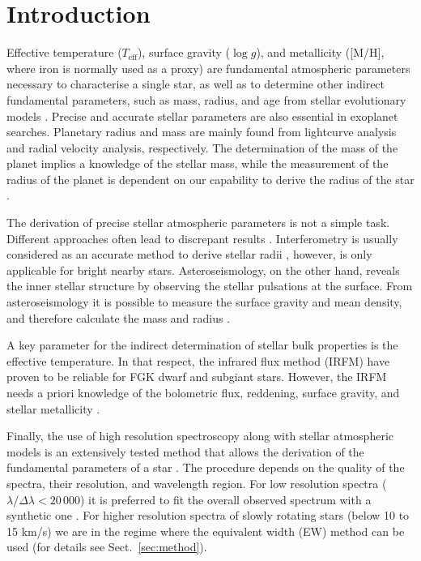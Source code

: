 \documentclass{aa}
\begin{document}
\maketitle



\section{Introduction}
\label{sec:introduction}

Effective temperature ($T_\mathrm{eff}$), surface gravity ($\log g$),
and metallicity ([M/H], where iron is normally used as a proxy)
are fundamental atmospheric parameters necessary to characterise a single
star, as well as to determine other indirect fundamental parameters,
such as mass, radius, and age from stellar evolutionary models
\citep[see e.g.][]{Girardi2000,Dotter2008,Baraffe2015}.
Precise and accurate stellar parameters are also essential in
exoplanet searches. Planetary radius and mass are mainly found from
lightcurve analysis and radial velocity analysis, respectively. The
determination of the mass of the planet implies a knowledge of the
stellar mass, while the measurement of the radius of the planet
is dependent on our capability to derive the radius of the star
\citep[see e.g.][]{Torres2008,Ammler2009,Torres2012}.

The derivation of precise stellar atmospheric parameters is not a simple
task. Different approaches often lead to discrepant results \citep[see
e.g.][]{Santos13}. Interferometry is usually considered as an accurate
method to derive stellar radii \citep[e.g.][]{Boyajian2012}, however,
is only applicable for bright nearby stars. Asteroseismology, on the
other hand, reveals the inner stellar structure by observing the stellar
pulsations at the surface. From asteroseismology it is possible to
measure the surface gravity and mean density, and therefore calculate
the mass and radius \citep[e.g.][]{Kjeldsen1995}.

A key parameter for the indirect determination of stellar bulk
properties is the effective temperature. In that respect, the infrared
flux method (IRFM) have proven to be reliable for FGK dwarf and
subgiant stars. However, the IRFM needs a priori knowledge of the
bolometric flux, reddening, surface gravity, and stellar metallicity
\citep{Blackwell1977,Ramirez2005b,Casagrande2010}.

Finally, the use of high resolution spectroscopy along with stellar
atmospheric models is an extensively tested method that allows
the derivation of the fundamental parameters of a star \citep[see
e.g.][]{Santos13,Valenti2005}. The procedure depends on the quality
of the spectra, their resolution, and wavelength region. For low
resolution spectra ($\lambda/\Delta\lambda < 20\,000$) it is
preferred to fit the overall observed spectrum with a synthetic one
\citep[see e.g.][]{Recio2006}. For higher resolution spectra of
slowly rotating stars (below 10 to 15 \si{km/s}) we are in the regime
where the equivalent width (EW) method can be used (for details see
Sect.~\ref{sec:method}).
\end{document}
